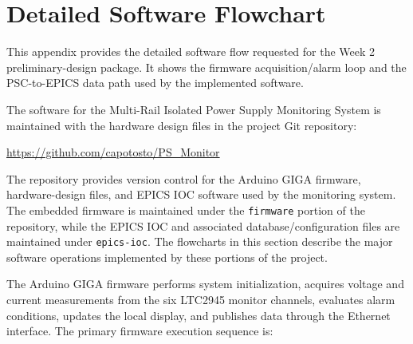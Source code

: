 \chapter{Detailed Software Flowchart}
\label{app:software-flowchart}
This appendix provides the detailed software flow requested for the Week 2
preliminary-design package. It shows the firmware acquisition/alarm loop and the
PSC-to-EPICS data path used by the implemented software.

The software for the Multi-Rail Isolated Power Supply Monitoring System is
maintained with the hardware design files in the project Git repository:

\begin{center}
    \url{https://github.com/capotosto/PS_Monitor}
\end{center}

The repository provides version control for the Arduino GIGA firmware,
hardware-design files, and EPICS IOC software used by the monitoring system.
The embedded firmware is maintained under the \texttt{firmware} portion of the
repository, while the EPICS IOC and associated database/configuration files are
maintained under \texttt{epics-ioc}. The flowcharts in this section describe
the major software operations implemented by these portions of the project.

The Arduino GIGA firmware performs system initialization, acquires voltage and
current measurements from the six LTC2945 monitor channels, evaluates alarm
conditions, updates the local display, and publishes data through the Ethernet interface. The primary firmware execution
sequence is:

